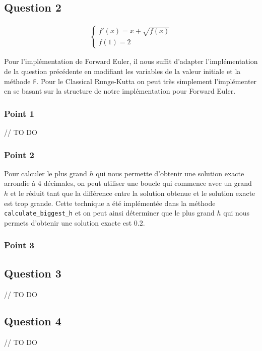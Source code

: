 \subsection{Question 2}

\begin{equation}
	\begin{aligned}
	\begin{cases}
	f'(x) = x + \sqrt{f(x)}\\
	f(1) = 2
	\end{cases}
	\end{aligned}
\end{equation}

Pour l'implémentation de Forward Euler, il nous suffit d'adapter l'implémentation de la question précédente en modifiant les variables de la valeur initiale et la méthode \texttt{F}. Pour le Classical Runge-Kutta on peut très simplement l'implémenter en se basant sur la structure de notre implémentation pour Forward Euler.


\subsubsection{Point 1}

// TO DO

\subsubsection{Point 2}

Pour calculer le plus grand $h$ qui nous permette d'obtenir une solution exacte arrondie à 4 décimales, on peut utiliser une boucle qui commence avec un grand $h$ et le réduit tant que la différence entre la solution obtenue et le solution exacte est trop grande. Cette technique a été implémentée dans la méthode \texttt{calculate\_biggest\_h} et on peut ainsi déterminer que le plus grand $h$ qui nous permets d'obtenir une solution exacte est $0.2$.

\subsubsection{Point 3}

\subsection{Question 3}

// TO DO

\subsection{Question 4}

// TO DO